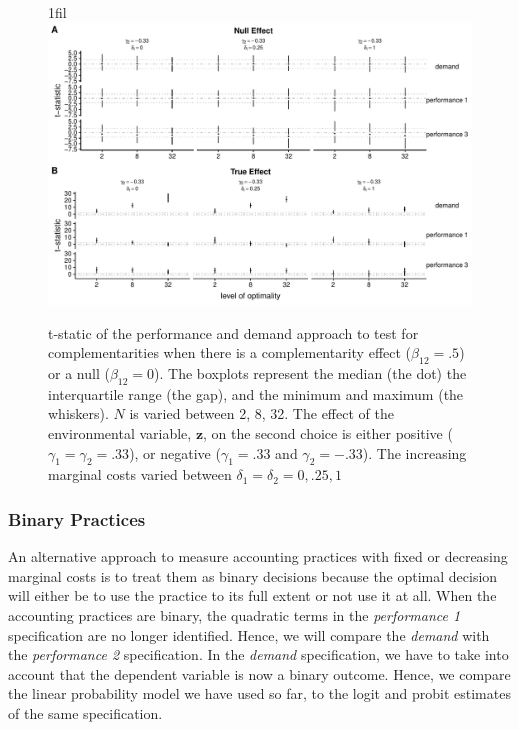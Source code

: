 \documentclass[12pt]{article}
\makeatletter
\newcommand*{\centerfloat}{%
  \parindent \z@
  \leftskip \z@ \@plus 1fil \@minus \textwidth
  \rightskip\leftskip
  \parfillskip \z@skip}
\makeatother
\begin{document}
\begin{figure}
\centerfloat
\includegraphics[width=450px]{figure-latex/delta_new_plot.pdf}
\caption[The Error Rate and Power with Different Levels of Marginal Costs]
{\label{delta} t-static of the performance and demand approach to test
for complementarities when there is a complementarity effect ($\beta_{12} = .5$)
or a null ($\beta_{12} = 0$). The boxplots represent the median (the dot) the
interquartile range (the gap), and the minimum and maximum (the whiskers). $N$
is varied between 2, 8, 32. The effect of the environmental
variable, $\mathbf{z}$, on the second choice is either positive
($\gamma_1 = \gamma_2 = .33$), or negative ($\gamma_1 = .33$ and $\gamma_2 = -.33$).
The increasing marginal costs varied between $\delta_1 = \delta_2 = 0, .25, 1$}
\end{figure}



\subsubsection{Binary Practices}

An alternative approach to measure accounting practices with fixed or decreasing marginal costs is to treat them as binary decisions because the optimal decision will either be to use the practice to its full extent or not use it at all. When the accounting practices are binary, the quadratic terms in the \emph{performance 1} specification are no longer identified. Hence, we will compare the \emph{demand} with the \emph{performance 2} specification. In the \emph{demand} specification, we have to take into account that the dependent variable is now a binary outcome. Hence, we compare the linear probability model we have used so far, to the logit and probit estimates of the same specification.  
\end{document}
